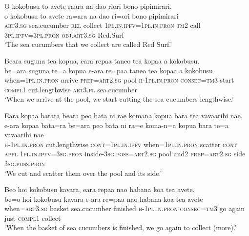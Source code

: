\ea\label{ex:text31-5}
O kokobusu to avete raara na dao riori bono pipimirari.\\
\gll o	kokobusu	to	avete	ra=ara	na	dao	ri=ori	bono	pipimirari\\
     \textsc{art}3.\textsc{sg}	sea.cucumber	\textsc{rel}	collect	1\textsc{pl}.\textsc{in}.\textsc{ipfv}=1\textsc{pl}.\textsc{in}.\textsc{pron}	\textsc{tm}2	call	3\textsc{pl}.\textsc{ipfv}=3\textsc{pl}.\textsc{pron}	\textsc{obj}.\textsc{art}3.\textsc{sg}	Red.Surf\\
\glt `The sea cucumbers that we collect are called Red Surf.'
\z

\ea\label{ex:text31-6}
Beara suguna tea kopua, eara repaa taneo tea kopaa a kokobusu.\\
\gll be=ara	suguna	te=a	kopua	e-ara	re=paa	taneo	tea	kopaa	a	kokobusu\\
     when=1\textsc{pl}.\textsc{in}.\textsc{pron}	arrive	\textsc{prep}=\textsc{art}2.\textsc{sg}	pool	\textsc{h}-1\textsc{pl}.\textsc{in}.\textsc{pron}	\textsc{consec}=\textsc{tm}3	start	\textsc{compl}1	cut.lengthwise	\textsc{art}3.\textsc{pl}	sea.cucumber\\
\glt `When we arrive at the pool, we start cutting the sea cucumbers lengthwise.'
\z

\ea\label{ex:text31-7}
Eara kopaa batara beara peo bata ni rae komana kopua bara tea vavaarihi nae.\\
\gll e-ara	kopaa	bata=ra	be=ara	peo	bata	ni	ra=e	koma-n=a	kopua	bara	te=a	vavaarihi	nae\\
     \textsc{h}-1\textsc{pl}.\textsc{in}.\textsc{pron}	cut.lengthwise	\textsc{cont}=1\textsc{pl}.\textsc{in}.\textsc{ipfv}	when=1\textsc{pl}.\textsc{in}.\textsc{pron}	scatter	\textsc{cont}	\textsc{appl}	1\textsc{pl}.\textsc{in}.\textsc{ipfv}=3\textsc{sg}.\textsc{pron}	inside-3\textsc{sg}.\textsc{poss}=\textsc{art}2.\textsc{sg}	pool	and2	\textsc{prep}=\textsc{art}2.\textsc{sg}	side	3\textsc{sg}.\textsc{poss}.\textsc{pron}\\
\glt `We cut and scatter them over the pool and its side.'
\z

\ea\label{ex:text31-8}
Beo hoi kokobusu kavara, eara repaa nao habana koa tea avete.\\
\gll be=o	hoi	kokobusu	kavara	e-ara	re=paa	nao	habana	koa	tea	avete\\
     when=\textsc{art}3.\textsc{sg}	basket	sea.cucumber	finished	\textsc{h}-1\textsc{pl}.\textsc{in}.\textsc{pron}	\textsc{consec}=\textsc{tm}3	go	again	just	\textsc{compl}1	collect\\
\glt `When the basket of sea cucumbers is finished, we go again to collect (more).'
\z

